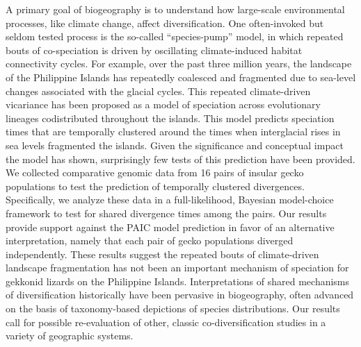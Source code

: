 A primary goal of biogeography is to understand how large-scale environmental
processes, like climate change, affect diversification.
One often-invoked but seldom tested process is the so-called ``species-pump''
model, in which repeated bouts of co-speciation is driven by oscillating
climate-induced habitat connectivity cycles.
For example, over the past three million years, the landscape of the Philippine
Islands has repeatedly coalesced and fragmented due to sea-level changes
associated with the glacial cycles.
This repeated climate-driven vicariance has been proposed as a model of
speciation across evolutionary lineages codistributed throughout the islands.
This model predicts speciation times that are temporally clustered around
the times when interglacial rises in sea levels fragmented the islands.
Given the significance and conceptual impact the model has shown, surprisingly
few tests of this prediction have been provided.
We collected comparative genomic data from 16 pairs of insular gecko populations
to test the prediction of temporally clustered divergences.
Specifically, we analyze these data in a full-likelihood, Bayesian model-choice
framework to test for shared divergence times among the pairs.
Our results provide support against the PAIC model prediction in favor of an
alternative interpretation, namely that each pair of gecko populations diverged
independently.
These results suggest the repeated bouts of climate-driven landscape
fragmentation has not been an important mechanism of speciation for
gekkonid lizards on the Philippine Islands.
Interpretations of shared mechanisms of diversification historically have been
pervasive in biogeography, often advanced on the basis of taxonomy-based
depictions of species distributions.
Our results call for possible re-evaluation of other, classic
co-diversification studies in a variety of geographic systems.
